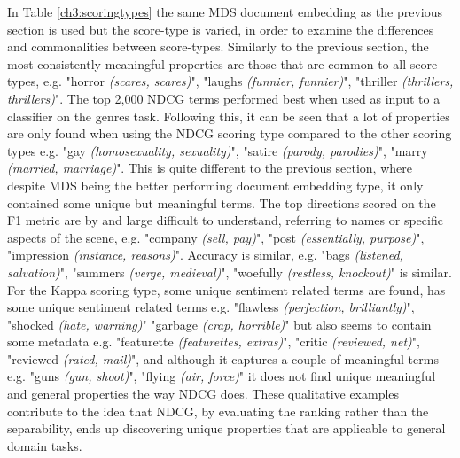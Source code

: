 In Table \ref{ch3:scoringtypes} the same MDS document embedding as the previous section is used but the score-type is varied, in order to examine the differences and commonalities between score-types.  Similarly to the previous section,   the most consistently meaningful properties are those that are common to all score-types, e.g. "horror \textit{(scares, scares)}", "laughs \textit{(funnier, funnier)}", "thriller \textit{(thrillers, thrillers)}". The top 2,000 NDCG terms performed best when used as input to a classifier on the genres task. Following this, it can be seen that a lot of properties are only found when using the NDCG scoring type compared to the other scoring types e.g. "gay \textit{(homosexuality, sexuality)}", "satire \textit{(parody, parodies)}",  "marry \textit{(married, marriage)}". This is quite different to the previous section, where despite MDS being the better performing document embedding type, it only contained some unique but meaningful terms. The top directions scored on  the F1 metric  are by and large  difficult to understand, referring to names or specific aspects of the scene, e.g. "company \textit{(sell, pay)}", "post \textit{(essentially, purpose)}", "impression \textit{(instance, reasons)}". Accuracy is similar, e.g. "bags \textit{(listened, salvation)}",  "summers \textit{(verge, medieval)}", "woefully \textit{(restless, knockout)}" is similar. For the Kappa scoring type, some unique  sentiment  related terms are found, has some unique sentiment related terms e.g. "flawless \textit{(perfection, brilliantly)}", "shocked \textit{(hate, warning)}" "garbage \textit{(crap, horrible)}" but also seems to contain some metadata e.g. "featurette \textit{(featurettes, extras)}", "critic \textit{(reviewed, net)}", "reviewed \textit{(rated, mail)}", and although it captures  a couple of meaningful terms e.g. "guns \textit{(gun, shoot)}", "flying \textit{(air, force)}" it does not find unique meaningful and general properties the way NDCG does. These qualitative examples contribute to the idea that NDCG, by evaluating the ranking rather than the separability, ends up discovering unique properties that are applicable to general domain tasks.
